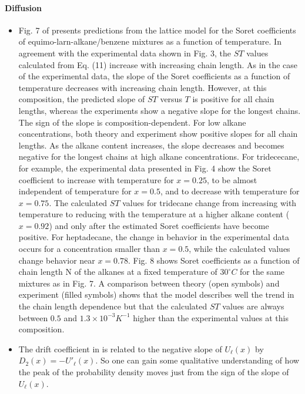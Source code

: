 \documentclass[11pt]{book}
\begin{document}
\paragraph{Diffusion}
\begin{itemize}
\item Fig. 7 of \cite{polyakov2006study}
presents predictions from the lattice model for the Soret coefficients
of equimo-larn-alkane/benzene mixtures as a function of temperature.
In agreement with the experimental data shown in Fig. 3, the $ST$
values calculated from Eq. (11) increase with increasing chain length.
As in the case of the experimental data, the slope of the Soret coefficients
as a function of temperature decreases with increasing chain length.
However, at this composition, the predicted slope of $ST$ versus
$T$ is positive for all chain lengths, whereas the experiments show
a negative slope for the longest chains. The sign of the slope is
composition-dependent. For low alkane concentrations, both theory
and experiment show positive slopes for all chain lengths. As the
alkane content increases, the slope decreases and becomes negative
for the longest chains at high alkane concentrations. For tridececane,
for example, the experimental data presented in Fig. 4 show the Soret
coefficient to increase with temperature for $x=0.25$, to be almost
independent of temperature for $x=0.5$, and to decrease with temperature
for $x=0.75$. The calculated $ST$ values for tridecane change from
increasing with temperature to reducing with the temperature at a
higher alkane content ($x=0.92$) and only after the estimated Soret
coefficients have become positive. For heptadecane, the change in
behavior in the experimental data occurs for a concentration smaller
than $x=0.5$, while the calculated values change behavior near $x=0.78$.
Fig. 8 shows Soret coefficients as a function of chain length N of
the alkanes at a fixed temperature of $30^{\circ}C$ for the same
mixtures as in Fig. 7. A comparison between theory (open symbols)
and experiment (filled symbols) shows that the model describes well
the trend in the chain length dependence but that the calculated $ST$
values are always between $0.5$ and $1.3\times10^{-3}K^{-1}$ higher
than the experimental values at this composition.
\item The drift coefficient in \cite{ho2020fractional}
is related to the negative slope of $U_{\ell}\left(x\right)$ by $D_{2}\left(x\right)=-U'_{\ell}\left(x\right)$.
So one can gain some qualitative understanding of how the peak of
the probability density moves just from the sign of the slope of $U_{\ell}\left(x\right)$.

\end{itemize}
\end{document}
